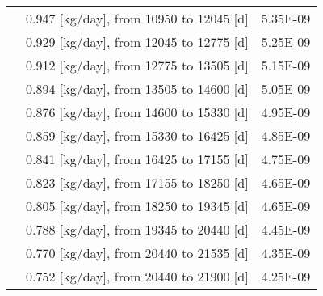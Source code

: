 \begin{longtable}{|p{}|p{}|p{}|}
	&   0.947  [kg/day], from 10950 to 12045 [d] &	5.35E-09 \\
	& 0.929  [kg/day], from 12045 to 12775 [d] &	5.25E-09 \\
	&  0.912   [kg/day], from 12775 to 13505 [d] &	5.15E-09 \\
	&   0.894  [kg/day], from 13505 to 14600 [d] &	5.05E-09 \\
	&  0.876 [kg/day], from 14600 to 15330 [d] &	4.95E-09 \\
	& 0.859   [kg/day], from 15330 to 16425 [d] &	4.85E-09 \\
	&  0.841 [kg/day], from 16425 to 17155 [d] &	4.75E-09 \\
	&  0.823 [kg/day], from 17155 to 18250 [d] &	4.65E-09 \\
	&  0.805 [kg/day], from 18250 to 19345 [d] &	4.65E-09 \\
	& 0.788  [kg/day], from 19345 to 20440 [d] &	4.45E-09 \\
	&  0.770 [kg/day], from 20440 to 21535 [d] &	4.35E-09 \\
	& 0.752 [kg/day], from 20440 to 21900 [d] &	4.25E-09 \\
	\hline
\end{longtable}